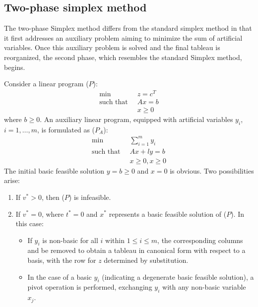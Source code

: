 \subsection{Two-phase simplex method}
The two-phase Simplex method differs from the standard simplex method in that it first addresses an auxiliary problem aiming to minimize the sum of artificial variables. 
Once this auxiliary problem is solved and the final tableau is reorganized, the second phase, which resembles the standard Simplex method, begins.

Consider a linear program ($P$): 
\begin{align*}
    \min                      \:&\:z=c^T            \\
    \text{such that }     &\: Ax=b            \\
                                &\: x \geq 0
\end{align*}
where $b \geq 0$. 
An auxiliary linear program, equipped with artificial variables $y_i$, $i=1,\dots,m$, is formulated as ($P_A$): 
\begin{align*}
    \min                      \:&\: \sum_{i=1}^{m}y_i               \\
    \text{such that }     &\: Ax+ly=b                         \\
                                &\: x \geq 0, x \geq 0
\end{align*}
The initial basic feasible solution $y=b \geq 0$ and $x=0$ is obvious. 
Two possibilities arise:
\begin{enumerate}
    \item If $v^{\ast}>0$, then ($P$) is infeasible.
    \item If $v^{\ast}=0$, where $t^{\ast}=0$ and $x^{\ast}$ represents a basic feasible solution of ($P$). 
        In this case: 
        \begin{itemize}
            \item If $y_i$ is non-basic for all $i$ within $1 \leq i \leq m$, the corresponding columns and be removed to obtain a tableau in canonical form with respect to a basis, with the row for $z$ determined by substitution.
            \item In the case of a basic $y_i$ (indicating a degenerate basic feasible solution), a pivot operation is performed, exchanging $y_i$ with any non-basic variable $x_j$.
        \end{itemize}
\end{enumerate}
